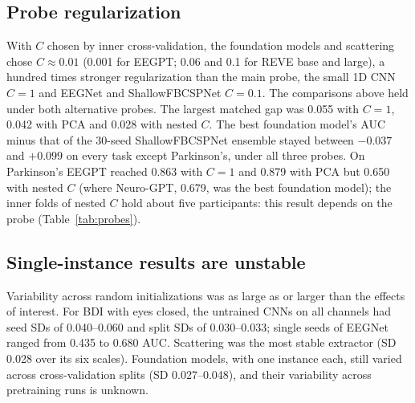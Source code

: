 \documentclass[11pt]{article}
\begin{document}
\subsection{Probe regularization}
With $C$ chosen by inner cross-validation, the foundation models and scattering chose $C \approx
0.01$ (0.001 for EEGPT; 0.06 and 0.1 for REVE base and large), a hundred times stronger regularization than the main probe, the small 1D CNN $C = 1$ and
EEGNet and ShallowFBCSPNet $C = 0.1$. The comparisons above held under both alternative probes. The
largest matched gap was 0.055 with $C = 1$, 0.042 with PCA and 0.028 with nested $C$. The best
foundation model's AUC minus that of the 30-seed ShallowFBCSPNet ensemble stayed between $-0.037$
and $+0.099$ on every task except Parkinson's, under all three probes. On Parkinson's EEGPT reached
0.863 with $C = 1$ and 0.879 with PCA but 0.650 with nested $C$ (where Neuro-GPT, 0.679, was the best
foundation model); the inner folds of nested $C$ hold about five participants: this result depends on the probe (Table~\ref{tab:probes}).

\subsection{Single-instance results are unstable}
Variability across random initializations was as large as or larger than the effects of interest.
For BDI with eyes closed, the untrained CNNs on all channels had seed SDs of 0.040--0.060 and
split SDs of 0.030--0.033; single seeds of EEGNet ranged from 0.435 to 0.680 AUC. Scattering was
the most stable extractor (SD 0.028 over its six scales). Foundation models, with one instance
each, still varied across cross-validation splits (SD 0.027--0.048), and their variability across
pretraining runs is unknown.
\end{document}
